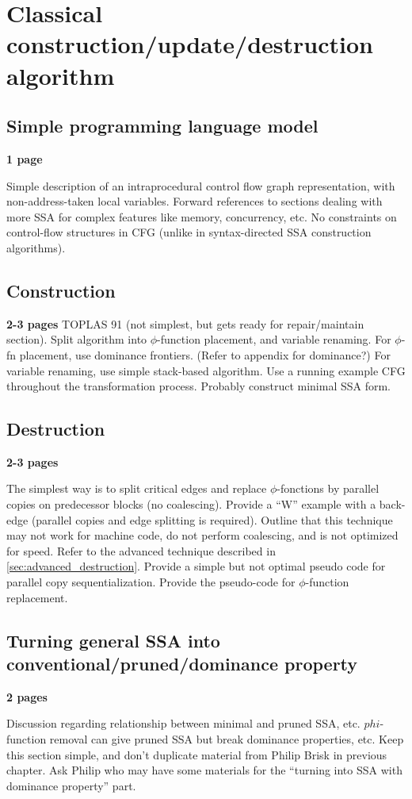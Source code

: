 \applynumberofpages\chapter{Classical construction/update/destruction algorithm }

\section{Simple programming language model}
\textbf{1 page}

Simple description of an intraprocedural control flow graph
representation, with non-address-taken local variables.
Forward references to sections dealing with more SSA for complex
features like memory, concurrency, etc.
No constraints on control-flow structures in CFG
(unlike in syntax-directed SSA construction algorithms).


\section{Construction}
\textbf{2-3 pages}
TOPLAS 91 (not simplest, but gets ready for repair/maintain section).
Split algorithm into $\phi$-function placement, and variable
renaming. For $\phi$-fn placement, use dominance frontiers.
(Refer to appendix for dominance?) 
For variable renaming, use simple stack-based algorithm.
Use a running example CFG throughout the transformation process.
Probably construct minimal SSA form.

\section{Destruction }
\label{sec:classical_destruction}
\textbf{2-3 pages}

The simplest way is to split critical edges and replace $\phi$-fonctions by parallel copies on predecessor blocks (no coalescing). Provide a ``W'' example with a back-edge (parallel copies and edge splitting is required). Outline that this technique may not work for machine code, do not perform coalescing, and is not optimized for speed. Refer to the advanced technique described in \ref{sec:advanced_destruction}. Provide a simple but not optimal pseudo code for parallel copy sequentialization. Provide the pseudo-code for $\phi$-function replacement.

\section{Turning general SSA into conventional/pruned/dominance property}
\textbf{2 pages}

Discussion regarding relationship between minimal and pruned SSA, etc.
$phi$-function removal can give pruned SSA but break
dominance properties, etc. Keep this section simple, and don't duplicate
material from Philip Brisk in previous chapter.
Ask Philip who may have some materials for the ``turning into SSA with dominance property'' part.

